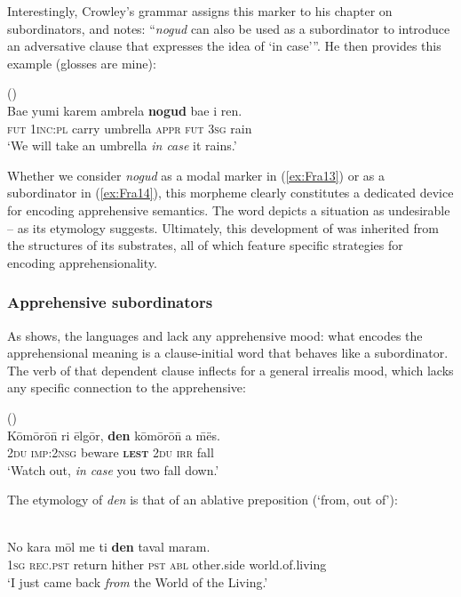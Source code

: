 \documentclass[output=paper,colorlinks,citecolor=brown]{langscibook}
\begin{document}
Interestingly, Crowley's grammar assigns this marker to his chapter on subordinators, and notes: ``\textit{nogud} can also be used as a subordinator to introduce an adversative clause that expresses the idea of `in case'{''}. He then provides this example (glosses are mine):


\ea \label{ex:Fra14} \textnormal{ (\citealt[186]{Crowley2004})} \\
\gll  Bae yumi karem ambrela \textbf{nogud} bae i ren. \\
\textsc{fut} \textsc{1inc:pl} carry umbrella \textsc{appr} \textsc{fut} \textsc{3sg} rain \\
\glt `We will take an umbrella \textit{in case} it rains.' 
\z


Whether we consider \textit{nogud} as a modal marker in (\ref{ex:Fra13}) or as a subordinator in (\ref{ex:Fra14}), this morpheme clearly constitutes a dedicated device for encoding apprehensive semantics. The word depicts a situation as undesirable -- as its etymology suggests. Ultimately, this development of  was inherited from the structures of its  substrates, all of which feature specific strategies for encoding apprehensionality.



\subsubsection{Apprehensive subordinators}
\label{subsubsec:appsub}

 
As  shows, the languages  and  lack any apprehensive mood: what encodes the apprehensional meaning is a clause-initial word that behaves like a subordinator. The verb of that dependent clause inflects for a general \mbox{irrealis} mood, which lacks any specific connection to the apprehensive:
 
\ea \label{ex:Fra15} \textnormal{ (\citealt{Malau2021}) }\\
\gll Kōmōrō\={n} ri ēlgōr, \textbf{den} kōmōrō\={n} a \={m}ës. \\
\textsc{2du} \textsc{imp:2nsg} beware \textsc{\textbf{lest}} \textsc{2du} \textsc{irr} fall \\
\glt `Watch out, \textit{in case} you two fall down.' 
\z

\noindent The etymology of \textit{den} is that of an ablative preposition (`from, out of'):
 
\ea \label{ex:Fra16} \textnormal{ } \\
\gll No kara mōl me ti \textbf{den} taval maram. \\
\textsc{1sg} \textsc{rec.pst} return hither \textsc{pst} \textsc{abl} other.side world.of.living \\
\glt `I just came back \textit{from} the World of the Living.' 
\z
\end{document}
